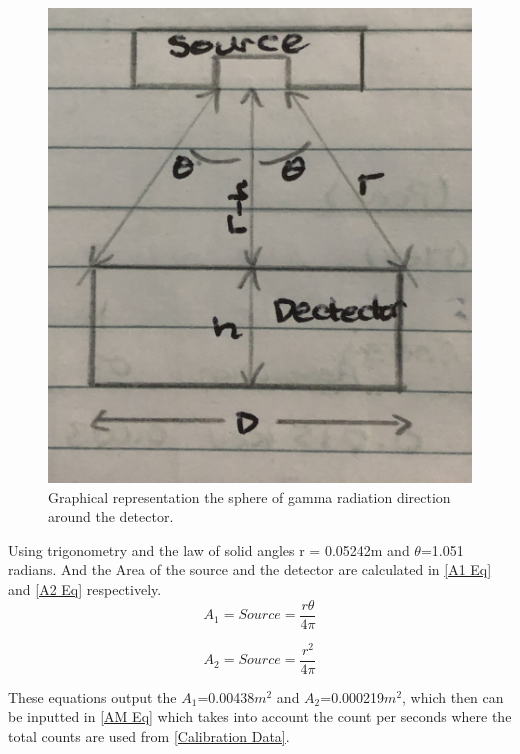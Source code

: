 \documentclass[12pt]{article}
\begin{document}
\begin{figure}[H]
\centering
\includegraphics[scale=0.12]{Images/IMG_0339.jpg}
\caption{Graphical representation the sphere of gamma radiation direction around the detector.}
\label{detector}
\end{figure}

Using trigonometry and the law of solid angles r = 0.05242m and $\theta$=1.051 radians. And the Area of the source and the detector are calculated in \cref{A1 Eq} and \cref{A2 Eq} respectively.\\

\begin{equation}
A_1 = Source = \dfrac{r\theta}{4\pi} 
\label{A1 Eq}
\end{equation} 

\begin{equation}
A_2 = Source = \dfrac{r^2}{4\pi} 
\label{A2 Eq}
\end{equation} 

These equations output the $A_1$=0.00438$m^2$ and $A_2$=0.000219$m^2$, which then can be inputted in \cref{AM Eq} which takes into account the count per seconds where the total counts are used from \cref{Calibration Data}.\\
\end{document}
